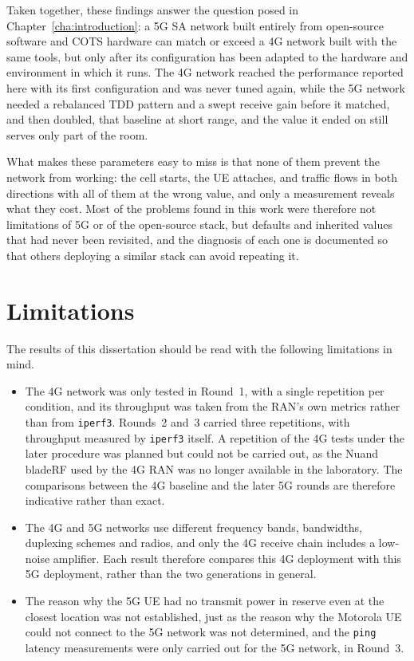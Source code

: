 Taken together, these findings answer the question posed in Chapter~\ref{cha:introduction}: a 5G \gls{SA} network built entirely from open-source software and \gls{COTS} hardware can match or exceed a 4G network built with the same tools, but only after its configuration has been adapted to the hardware and environment in which it runs. The 4G network reached the performance reported here with its first configuration and was never tuned again, while the 5G network needed a rebalanced \gls{TDD} pattern and a swept receive gain before it matched, and then doubled, that baseline at short range, and the value it ended on still serves only part of the room.

What makes these parameters easy to miss is that none of them prevent the network from working: the cell starts, the \gls{UE} attaches, and traffic flows in both directions with all of them at the wrong value, and only a measurement reveals what they cost. Most of the problems found in this work were therefore not limitations of 5G or of the open-source stack, but defaults and inherited values that had never been revisited, and the diagnosis of each one is documented so that others deploying a similar stack can avoid repeating it.

\section{Limitations}
\label{sec:conclusions-limitations}

The results of this dissertation should be read with the following limitations in mind.

\begin{itemize}
    \item The 4G network was only tested in Round~1, with a single repetition per condition, and its throughput was taken from the \gls{RAN}'s own metrics rather than from \texttt{iperf3}. Rounds~2 and~3 carried three repetitions, with throughput measured by \texttt{iperf3} itself. A repetition of the 4G tests under the later procedure was planned but could not be carried out, as the Nuand bladeRF used by the 4G \gls{RAN} was no longer available in the laboratory. The comparisons between the 4G baseline and the later 5G rounds are therefore indicative rather than exact.

    \item The 4G and 5G networks use different frequency bands, bandwidths, duplexing schemes and radios, and only the 4G receive chain includes a low-noise amplifier. Each result therefore compares this 4G deployment with this 5G deployment, rather than the two generations in general.

    \item The reason why the 5G \gls{UE} had no transmit power in reserve even at the closest location was not established, just as the reason why the Motorola \gls{UE} could not connect to the 5G network was not determined, and the \texttt{ping} latency measurements were only carried out for the 5G network, in Round~3.
\end{itemize}

